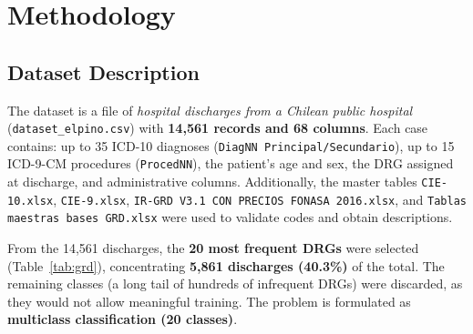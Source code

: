 \documentclass{ieeeaccess}
\begin{document}
\section{Methodology}
\label{sec:methodology}
\subsection{Dataset Description}
\label{sec:dataset}
The dataset is a file of \emph{hospital discharges from a Chilean public hospital} (\texttt{dataset\_elpino.csv}) with \textbf{14,561 records and 68 columns}. Each case contains: up to 35 ICD-10 diagnoses (\texttt{DiagNN Principal/Secundario}), up to 15 ICD-9-CM procedures (\texttt{ProcedNN}), the patient's age and sex, the DRG assigned at discharge, and administrative columns. Additionally, the master tables \texttt{CIE-10.xlsx}, \texttt{CIE-9.xlsx}, \texttt{IR-GRD V3.1 CON PRECIOS FONASA 2016.xlsx}, and \texttt{Tablas maestras bases GRD.xlsx} were used to validate codes and obtain descriptions.

From the 14,561 discharges, the \textbf{20 most frequent DRGs} were selected (Table~\ref{tab:grd}), concentrating \textbf{5,861 discharges (40.3\%)} of the total. The remaining classes (a long tail of hundreds of infrequent DRGs) were discarded, as they would not allow meaningful training. The problem is formulated as \textbf{multiclass classification (20 classes)}.
\end{document}
